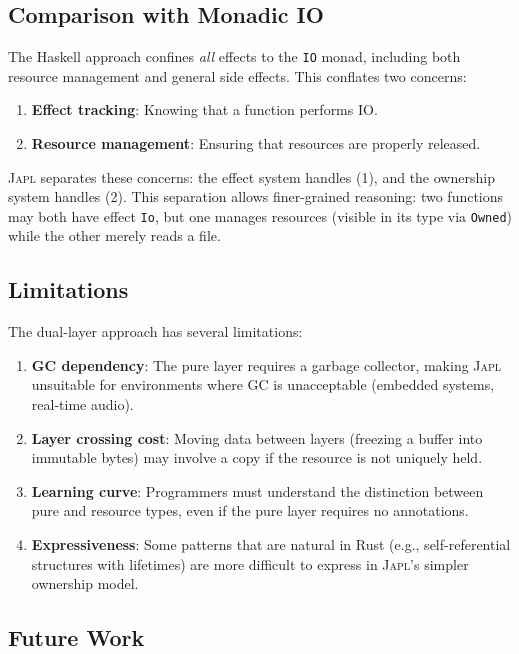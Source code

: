 \documentclass[11pt]{article}
\newcommand{\JAPL}{\textsc{Japl}}
\begin{document}
\subsection{Comparison with Monadic IO}

The Haskell approach confines \emph{all} effects to the \texttt{IO}
monad, including both resource management and general side effects.
This conflates two concerns:

\begin{enumerate}
  \item \textbf{Effect tracking}: Knowing that a function performs IO.
  \item \textbf{Resource management}: Ensuring that resources are
        properly released.
\end{enumerate}

\JAPL{} separates these concerns: the effect system handles (1), and
the ownership system handles (2).  This separation allows finer-grained
reasoning: two functions may both have effect \texttt{Io}, but one
manages resources (visible in its type via \texttt{Owned}) while the
other merely reads a file.

\subsection{Limitations}

The dual-layer approach has several limitations:

\begin{enumerate}
  \item \textbf{GC dependency}: The pure layer requires a garbage
        collector, making \JAPL{} unsuitable for environments where
        GC is unacceptable (embedded systems, real-time audio).
  \item \textbf{Layer crossing cost}: Moving data between layers
        (freezing a buffer into immutable bytes) may involve a copy
        if the resource is not uniquely held.
  \item \textbf{Learning curve}: Programmers must understand the
        distinction between pure and resource types, even if the
        pure layer requires no annotations.
  \item \textbf{Expressiveness}: Some patterns that are natural in
        Rust (e.g., self-referential structures with lifetimes) are
        more difficult to express in \JAPL{}'s simpler ownership model.
\end{enumerate}

\subsection{Future Work}
\end{document}
